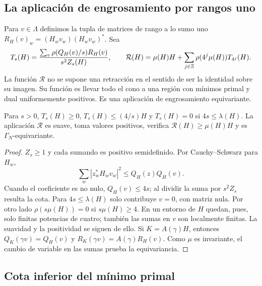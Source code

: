 \subsection{La aplicación de engrosamiento por rangos uno}

Para $v\in\Lambda$ definimos la tupla de matrices de rango a lo sumo uno $R_H(v)_w=(H_wv_w)(H_wv_w)^*$. Sea
\begin{equation}
 T_s(H)=\frac{\sum_v\rho(Q_H(v)/s)R_H(v)}{s^2 Z_s(H)},\qquad
 \mathcal R(H)=\mu(H)H+\sum_{j\in\mathbb{Z}}\rho(4^j\mu(H))T_{4^j}(H).
 \label{eq:ahr-ret}
\end{equation}
La función $\mathcal R$ no se supone una retracción en el sentido de ser la identidad sobre su imagen. Su función es llevar todo el cono a una región con mínimos primal y dual uniformemente positivos. Es una aplicación de engrosamiento equivariante.

\begin{lema}
\label{lem:ahr-ret}
Para $s>0$, $T_s(H)\ge0$, $T_s(H)\le (4/s)H$ y $T_s(H)=0$ si $4s\le\lambda(H)$. La aplicación $\mathcal R$ es suave, toma valores positivos, verifica $\mathcal R(H)\ge\mu(H)H$ y es $\Gamma_N$-equivariante.
\end{lema}
\begin{proof}
$Z_s\ge1$ y cada sumando es positivo semidefinido. Por Cauchy--Schwarz para $H_w$,
\[
 \sum_w|z_w^*H_wv_w|^2\le Q_H(z)Q_H(v).
\]
Cuando el coeficiente es no nulo, $Q_H(v)\le4s$; al dividir la suma por $s^2Z_s$ resulta la cota. Para $4s\le\lambda(H)$ solo contribuye $v=0$, con matriz nula. Por otro lado $\rho(s\mu(H))=0$ si $s\mu(H)\ge4$. En un entorno de $H$ quedan, pues, solo finitas potencias de cuatro; también las sumas en $v$ son localmente finitas. La suavidad y la positividad se siguen de ello. Si $K=A(\gamma)H$, entonces $Q_K(\gamma v)=Q_H(v)$ y $R_K(\gamma v)=A(\gamma)R_H(v)$. Como $\mu$ es invariante, el cambio de variable en las sumas prueba la equivariancia.
\end{proof}

\subsection{Cota inferior del mínimo primal}

